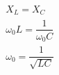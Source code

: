 \documentclass[preview]{standalone}
\begin{document}
\begin{align*}
X_L = X_C\\ \omega_0 L = \dfrac{1}{\omega_0 C}\\ \omega_0 = \dfrac{1}{\sqrt{LC}}
\end{align*}
\end{document}
